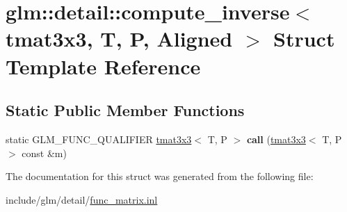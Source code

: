 \hypertarget{structglm_1_1detail_1_1compute__inverse_3_01tmat3x3_00_01T_00_01P_00_01Aligned_01_4}{}\section{glm\+:\+:detail\+:\+:compute\+\_\+inverse$<$ tmat3x3, T, P, Aligned $>$ Struct Template Reference}
\label{structglm_1_1detail_1_1compute__inverse_3_01tmat3x3_00_01T_00_01P_00_01Aligned_01_4}
\subsection*{Static Public Member Functions}
\begin{DoxyCompactItemize}
\item 
\mbox{\label{structglm_1_1detail_1_1compute__inverse_3_01tmat3x3_00_01T_00_01P_00_01Aligned_01_4_a8c096eccf2c888b134275d23bce097ae}} 
static G\+L\+M\+\_\+\+F\+U\+N\+C\+\_\+\+Q\+U\+A\+L\+I\+F\+I\+ER \hyperlink{structglm_1_1tmat3x3}{tmat3x3}$<$ T, P $>$ {\bfseries call} (\hyperlink{structglm_1_1tmat3x3}{tmat3x3}$<$ T, P $>$ const \&m)
\end{DoxyCompactItemize}


The documentation for this struct was generated from the following file\+:\begin{DoxyCompactItemize}
\item 
include/glm/detail/\hyperlink{func__matrix_8inl}{func\+\_\+matrix.\+inl}\end{DoxyCompactItemize}
